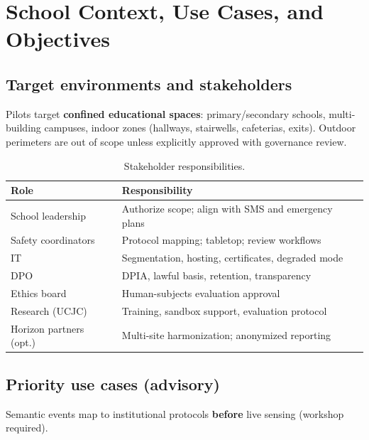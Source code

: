\section{School Context, Use Cases, and Objectives}
\label{sec:school-context}
\label{sec:safety-use-cases}
\label{sec:objectives}

\subsection{Target environments and stakeholders}

Pilots target \textbf{confined educational spaces}: primary/secondary schools, multi-building
campuses, indoor zones (hallways, stairwells, cafeterias, exits).
Outdoor perimeters are out of scope unless explicitly approved with governance review.

\begin{table}[htbp]
  \centering
  \caption{Stakeholder responsibilities.}
  \label{tab:stakeholders}
  \small
  \begin{tabular}{@{}p{2.6cm}p{8.4cm}@{}}
    \toprule
    Role & Responsibility \\
    \midrule
    School leadership & Authorize scope; align with SMS and emergency plans \\
    Safety coordinators & Protocol mapping; tabletop; review workflows \\
    IT & Segmentation, hosting, certificates, degraded mode \\
    DPO & DPIA, lawful basis, retention, transparency \\
    Ethics board & Human-subjects evaluation approval \\
    Research (UCJC) & Training, sandbox support, evaluation protocol \\
    Horizon partners (opt.) & Multi-site harmonization; anonymized reporting \\
    \bottomrule
  \end{tabular}
\end{table}

\subsection{Priority use cases (advisory)}

Semantic events map to institutional protocols \textbf{before} live sensing (workshop required).

